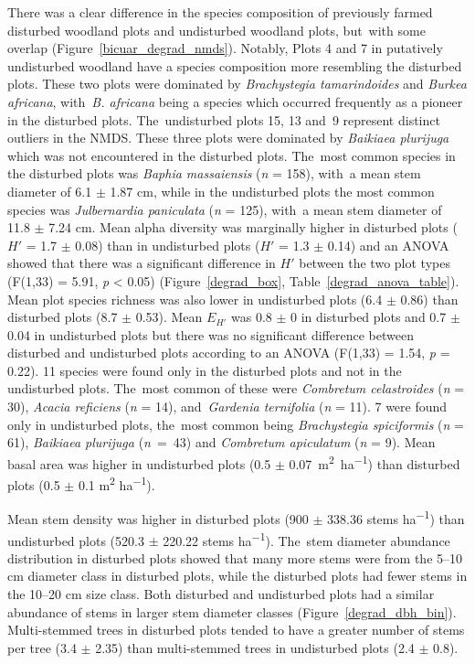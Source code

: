 \documentclass[diversity,article,accept,moreauthors,pdftex]{Definitions/mdpi}
\newcommand{\nbmdegrad}{158}
\newcommand{\njpdegrad}{125}
\newcommand{\degradshannon}{1.7 $\pm$ 0.08}
\newcommand{\bicuarsubshannon}{1.3 $\pm$ 0.14}
\newcommand{\degradrich}{8.7 $\pm$ 0.53}
\newcommand{\bicuarsubrich}{6.4 $\pm$ 0.86}
\newcommand{\degradba}{0.5 $\pm$ 0.1}
\newcommand{\bicuarsubba}{0.5 $\pm$ 0.07}
\newcommand{\degradequit}{0.8 $\pm$ 0}
\newcommand{\bicuarsubequit}{0.7 $\pm$ 0.04}
\newcommand{\lmshannondegrad}{F(1,33) = 5.91, \emph{p} < 0.05}
\newcommand{\lmequitdegrad}{F(1,33) = 1.54, \emph{p} = 0.22}
\newcommand{\ndegradonlyspecies}{11}
\newcommand{\nbigonlyspecies}{7}
\newcommand{\nccdegrad}{30}
\newcommand{\nvrdegrad}{14}
\newcommand{\ngtdegrad}{11}
\newcommand{\nbsbig}{61}
\newcommand{\nbpbig}{43}
\newcommand{\ncabig}{9}
\newcommand{\bmdbhdegrad}{6.1 $\pm$ 1.87}
\newcommand{\jpdbhbicuar}{11.8 $\pm$ 7.24}
\newcommand{\stemdensbicuar}{520.3 $\pm$ 220.22}
\newcommand{\stemdensdegrad}{900 $\pm$ 338.36}
\newcommand{\multistemdegrad}{3.4 $\pm$ 2.35}
\newcommand{\multistembicuar}{2.4 $\pm$ 0.8}
\begin{document}
There was a clear difference in the species composition of previously farmed disturbed woodland plots and undisturbed woodland plots, but~with some overlap (Figure~\ref{bicuar_degrad_nmds}). Notably, Plots 4 and 7 in putatively undisturbed woodland have a species composition more resembling the disturbed plots. These two plots were dominated by \textit{Brachystegia tamarindoides} and \textit{Burkea africana}, with~\textit{B. africana} being a species which occurred frequently as a pioneer in the disturbed plots. The~undisturbed plots 15, 13 and~9 represent distinct outliers in the NMDS. These three plots were dominated by \textit{Baikiaea plurijuga} which was not encountered in the disturbed plots. The~most common species in the disturbed plots was \textit{Baphia massaiensis} (\emph{n} = \nbmdegrad{}), with~a mean stem diameter of \bmdbhdegrad{} cm, while in the undisturbed plots the most common species was \textit{Julbernardia paniculata} (\emph{n} = \njpdegrad{}), with~a mean stem diameter of \jpdbhbicuar{} cm. Mean alpha diversity was marginally higher in disturbed plots ($H'$ = \degradshannon{}) than in undisturbed plots ($H'$ = \bicuarsubshannon{}) and an ANOVA showed that there was a significant difference in $H'$ between the two plot types (\lmshannondegrad{}) (Figure~\ref{degrad_box}, Table~\ref{degrad_anova_table}). Mean plot species richness was also lower in undisturbed plots (\bicuarsubrich{}) than disturbed plots (\degradrich{}). Mean $E_{H'}$ was \degradequit{} in disturbed plots and \bicuarsubequit{} in undisturbed plots but there was no significant difference between disturbed and undisturbed plots according to an ANOVA (\lmequitdegrad{}). \ndegradonlyspecies{} species were found only in the disturbed plots and not in the undisturbed plots. The~most common of these were \textit{Combretum celastroides} (\emph{n} = \nccdegrad{}), \textit{Acacia reficiens} (\emph{n} = \nvrdegrad{}), and~\textit{Gardenia ternifolia} (\emph{n} = \ngtdegrad{}). \nbigonlyspecies{} were found only in undisturbed plots, the~most common being \textit{Brachystegia spiciformis} (\emph{n} = \nbsbig{}), \textit{Baikiaea plurijuga} (\mbox{\emph{n} = \nbpbig{}}) and \textit{Combretum apiculatum} (\emph{n} = \ncabig{}). Mean basal area was higher in undisturbed plots (\bicuarsubba{}~m\textsuperscript{2}~ha\textsuperscript{$-$1}) than disturbed plots (\degradba{} m\textsuperscript{2} ha\textsuperscript{$-$1}). 

Mean stem density was higher in disturbed plots (\stemdensdegrad{} stems ha\textsuperscript{$-$1}) than undisturbed plots (\stemdensbicuar{} stems ha\textsuperscript{$-$1}). The~stem diameter abundance distribution in disturbed plots showed that many more stems were from the 5--10 cm diameter class in disturbed plots, while the disturbed plots had fewer stems in the 10--20 cm size class. Both disturbed and undisturbed plots had a similar abundance of stems in larger stem diameter classes (Figure~\ref{degrad_dbh_bin}). Multi-stemmed trees in disturbed plots tended to have a greater number of stems per tree (\multistemdegrad{}) than multi-stemmed trees in undisturbed plots (\multistembicuar{}).
\end{document}
